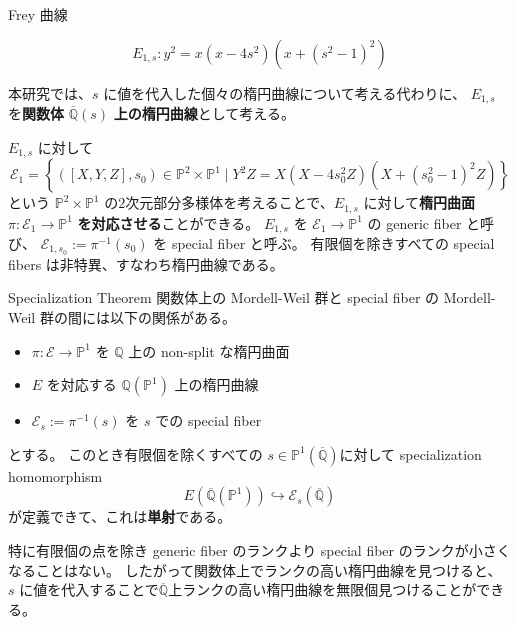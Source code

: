 \documentclass{classes/mybeamer}
\begin{document}
\begin{frame}{Frey 曲線}
    \begin{eg*}
        \begin{equation*}
            E_{1,s}: y^{2} = x(x - 4s^{2})(x + (s^{2} - 1)^{2})
        \end{equation*}
    \end{eg*}
    本研究では、$s$ に値を代入した個々の楕円曲線について考える代わりに、 $E_{1,s}$ を\textbf{関数体} $\overline{\mathbb{Q}}(s)$ \textbf{上の楕円曲線}として考える。
    \vspace{1cm}

    $E_{1,s}$ に対して
    \begin{equation*}
        \mathcal{E}_{1} = \left\{ ([X,Y,Z],s_0) \in \mathbb{P}^{2} \times \mathbb{P}^{1} \mid Y^{2}Z = X(X - 4s_{0}^{2}Z)(X + (s_{0}^{2} - 1)^{2}Z) \right\}
    \end{equation*}
    という $\mathbb{P}^{2} \times \mathbb{P}^{1}$ の$2$次元部分多様体を考えることで、$E_{1,s}$ に対して\textbf{楕円曲面} $\pi: \mathcal{E}_{1}\to \mathbb{P}^{1}$ \textbf{を対応させる}ことができる。
    $E_{1,s}$ を $\mathcal{E}_{1} \to \mathbb{P}^{1}$ の generic fiber と呼び、 $\mathcal{E}_{1,s_0}:=\pi^{-1}(s_0)$ を special fiber と呼ぶ。
    有限個を除きすべての special fibers は非特異、すなわち楕円曲線である。
\end{frame}

\begin{frame}{Specialization Theorem}
    関数体上の Mordell-Weil 群と special fiber の Mordell-Weil 群の間には以下の関係がある。
    \begin{thm}
        \label{thm:specialization}
        \begin{itemize}
            \item $\pi:\mathcal{E} \to \mathbb{P}^1$ を $\mathbb{Q}$ 上の non-split な楕円曲面
            \item $E$ を対応する $\mathbb{Q}(\mathbb{P}^1)$ 上の楕円曲線
            \item $\mathcal{E}_s:=\pi^{-1}(s)$ を $s$ での special fiber
        \end{itemize}
        とする。
        このとき有限個を除くすべての $s \in \mathbb{P}^1(\overline{\mathbb{Q}})$に対して specialization homomorphism
        \begin{equation*}
            E(\overline{\mathbb{Q}}(\mathbb{P}^1)) \hookrightarrow \mathcal{E}_{s}(\overline{\mathbb{Q}})
        \end{equation*}
        が定義できて、これは\textbf{単射}である。
    \end{thm}
    特に有限個の点を除き generic fiber のランクより special fiber のランクが小さくなることはない。
    したがって関数体上でランクの高い楕円曲線を見つけると、 $s$ に値を代入することで$\overline{\mathbb{Q}}$上ランクの高い楕円曲線を無限個見つけることができる。
\end{frame}
\end{document}
